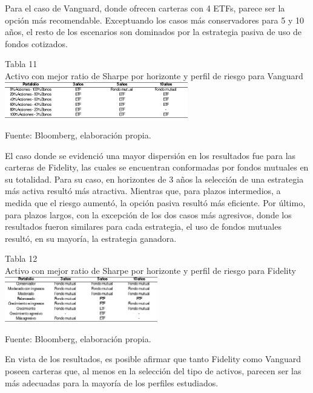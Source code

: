 \documentclass[a4paper,fleqn]{cas-sc}
\begin{document}
 Para el caso de Vanguard, donde ofrecen carteras con 4 ETFs, parece ser la opción más recomendable. Exceptuando los casos más conservadores para 5 y 10 años, el resto de los escenarios son dominados por la estrategia pasiva de uso de fondos cotizados.

 \begin{center}
     Tabla 11\\
     Activo con mejor ratio de Sharpe por horizonte y perfil de riesgo para Vanguard\\

     \includegraphics[width=0.6\textwidth]{image/tabla11.png}

     \tiny Fuente: Bloomberg, elaboración propia.
\end{center}

El caso donde se evidenció una mayor dispersión en los resultados fue para las carteras de Fidelity, las cuales se encuentran conformadas por fondos mutuales en su totalidad. Para su caso, en horizontes de 3 años la selección de una estrategia más activa resultó más atractiva. Mientras que, para plazos intermedios, a medida que el riesgo aumentó, la opción pasiva resultó más eficiente. Por último, para plazos largos, con la excepción de los dos casos más agresivos, donde los resultados fueron similares para cada estrategia, el uso de fondos mutuales resultó, en su mayoría, la estrategia ganadora.

\begin{center}
	Tabla 12\\
	Activo con mejor ratio de Sharpe por horizonte y perfil de riesgo para Fidelity\\

	\includegraphics[width=0.5\textwidth]{image/tabla12.png}

	\tiny Fuente: Bloomberg, elaboración propia.
\end{center}

En vista de los resultados, es posible afirmar que tanto Fidelity como Vanguard poseen carteras que, al menos en la selección del tipo de activos, parecen ser las más adecuadas para la mayoría de los perfiles estudiados.
\end{document}
